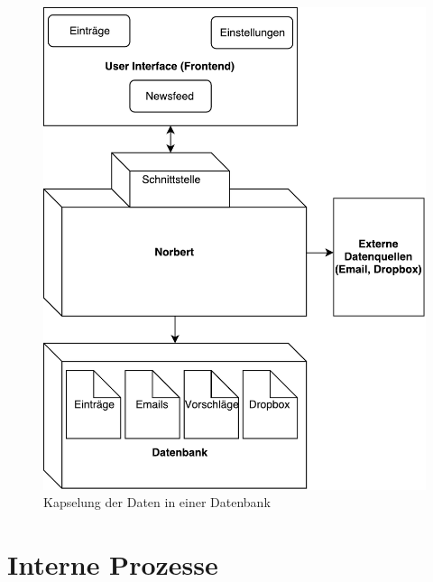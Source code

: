 \begin{figure}[H]
\centering
\includegraphics[scale=0.75]{uml-diagramms/daten_hlvl.pdf}
\caption{Kapselung der Daten in einer Datenbank}
\label{fig: DB_HLVL}
\end{figure}

\section{Interne Prozesse}

